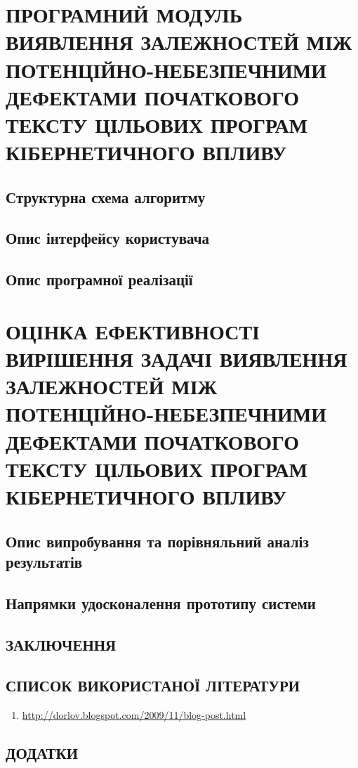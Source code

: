 \documentclass[oneside,final,14pt]{extreport}
\begin{document}
\pagebreak

\chapter{ПРОГРАМНИЙ МОДУЛЬ ВИЯВЛЕННЯ ЗАЛЕЖНОСТЕЙ МІЖ ПОТЕНЦІЙНО-НЕБЕЗПЕЧНИМИ ДЕФЕКТАМИ ПОЧАТКОВОГО ТЕКСТУ ЦІЛЬОВИХ ПРОГРАМ КІБЕРНЕТИЧНОГО ВПЛИВУ}
\label{3section::doc}\label{3section:id1}

\section{Структурна схема алгоритму}
\label{3section:id2}

\section{Опис інтерфейсу користувача}
\label{3section:id3}

\section{Опис програмної реалізації}
\label{3section:id4}

\pagebreak

\chapter{ОЦІНКА ЕФЕКТИВНОСТІ ВИРІШЕННЯ ЗАДАЧІ ВИЯВЛЕННЯ ЗАЛЕЖНОСТЕЙ МІЖ ПОТЕНЦІЙНО-НЕБЕЗПЕЧНИМИ ДЕФЕКТАМИ ПОЧАТКОВОГО ТЕКСТУ ЦІЛЬОВИХ ПРОГРАМ КІБЕРНЕТИЧНОГО ВПЛИВУ}
\label{4section::doc}\label{4section:id1}

\section{Опис випробування та порівняльний аналіз результатів}
\label{4section:id2}

\section{Напрямки удосконалення прототипу системи}
\label{4section:id3}

\section*{ЗАКЛЮЧЕННЯ}
\label{5decision::doc}\label{5decision:id1}

\section*{СПИСОК ВИКОРИСТАНОЇ ЛІТЕРАТУРИ}
\label{6literature::doc}\label{6literature:id1}\begin{enumerate}
\item {} 
\href{http://dorlov.blogspot.com/2009/11/blog-post.html}{http://dorlov.blogspot.com/2009/11/blog-post.html}

\end{enumerate}


\section*{ДОДАТКИ}
\label{7addition::doc}\label{7addition:id1}

\end{document}
